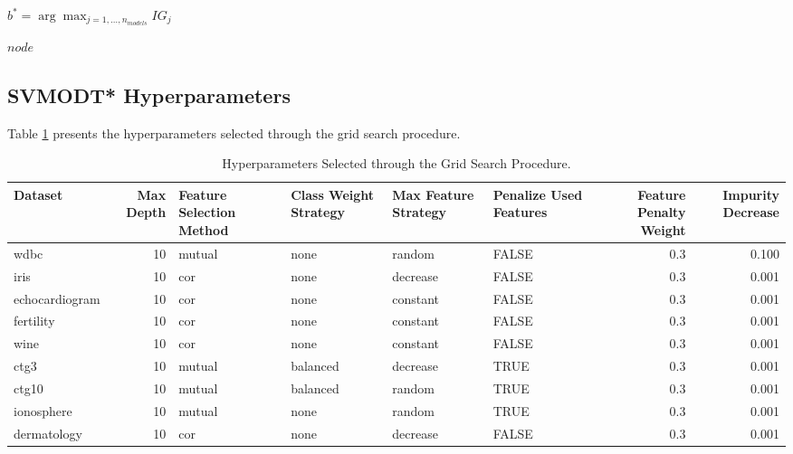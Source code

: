 \begin{algorithm}[H]
{    $b^* = \arg\max_{j=1,\ldots,n_{models}} IG_j$\newline
    
    
    \Return $node$\newline
}
\end{algorithm}

\subsection{SVMODT* Hyperparameters}\label{svmodt-hyperparameters}

Table \ref{tab:table-best-param-grid-latex} presents the hyperparameters selected through the grid search procedure.

\begin{table}[!h]
\centering
\caption{\label{tab:table-best-param-grid-latex}Hyperparameters Selected through the Grid Search Procedure.}
\centering
\fontsize{4}{6}\selectfont
\begin{tabular}[t]{l|r|l|l|l|l|r|r}
\hline
Dataset & Max Depth & Feature Selection Method & Class Weight Strategy & Max Feature Strategy & Penalize Used Features & Feature Penalty Weight & Impurity Decrease\\
\hline
wdbc & 10 & mutual & none & random & FALSE & 0.3 & 0.100\\
\hline
iris & 10 & cor & none & decrease & FALSE & 0.3 & 0.001\\
\hline
echocardiogram & 10 & cor & none & constant & FALSE & 0.3 & 0.001\\
\hline
fertility & 10 & cor & none & constant & FALSE & 0.3 & 0.001\\
\hline
wine & 10 & cor & none & constant & FALSE & 0.3 & 0.001\\
\hline
ctg3 & 10 & mutual & balanced & decrease & TRUE & 0.3 & 0.001\\
\hline
ctg10 & 10 & mutual & balanced & random & TRUE & 0.3 & 0.001\\
\hline
ionosphere & 10 & mutual & none & random & TRUE & 0.3 & 0.001\\
\hline
dermatology & 10 & cor & none & decrease & FALSE & 0.3 & 0.001\\
\hline
\end{tabular}
\end{table}

